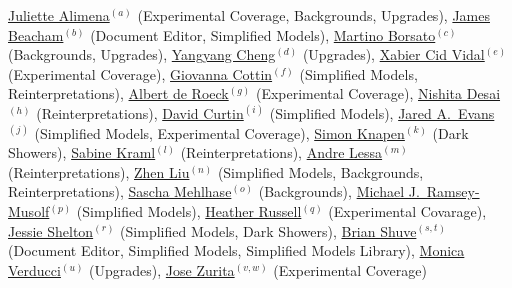 \noindent  \href{mailto:juliette.alimena@cern.ch}{Juliette Alimena}$^{(a)}$ (Experimental Coverage, Backgrounds, Upgrades), \href{mailto:j.beacham@cern.ch}{James Beacham}$^{(b)}$ (Document Editor, Simplified Models), \href{mailto:martino.borsato@cern.ch}{Martino Borsato}$^{(c)}$ (Backgrounds, Upgrades),
\href{mailto:yangyang.cheng@cornell.edu}{Yangyang Cheng}$^{(d)}$ (Upgrades), \href{mailto:xabier.cid.vidal@cern.ch}{Xabier Cid Vidal}$^{(e)}$ (Experimental Coverage), \href{mailto:gcottin@phys.ntu.edu.tw}{Giovanna Cottin}$^{(f)}$ (Simplified Models, Reinterpretations), \href{mailto:deroeck@mail.cern.ch}{Albert de Roeck}$^{(g)}$ (Experimental Coverage), \href{mailto:ddesai@theory.tifr.res.in}{Nishita Desai}$^{(h)}$ (Reinterpretations), \href{mailto:dcurtin@physics.utoronto.ca}{David Curtin}$^{(i)}$ (Simplified Models), \href{mailto:jaredaevans@gmail.com}{Jared A.~Evans}$^{(j)}$ (Simplified Models, Experimental Coverage), \href{mailto:knapen@ias.edu}{Simon Knapen}$^{(k)}$ (Dark Showers), \href{mailto:sabine.kraml@lpsc.in2p3.fr}{Sabine Kraml}$^{(l)}$ (Reinterpretations), \href{mailto:andre.lessa@ufabc.edu.br}{Andre Lessa}$^{(m)}$ (Reinterpretations),  \href{mailto:zliuphys@umd.edu}{Zhen Liu}$^{(n)}$ (Simplified Models, Backgrounds, Reinterpretations), \href{mailto:sascha.mehlhase@cern.ch}{Sascha Mehlhase}$^{(o)}$ (Backgrounds), \href{mailto:mjrm@physics.umass.edu}{Michael J.~Ramsey-Musolf}$^{(p)}$ (Simplified Models),
\href{mailto:hrussell@cern.ch}{Heather Russell}$^{(q)}$ (Experimental Covarage), \href{mailto:sheltonj@illinois.edu}{Jessie Shelton}$^{(r)}$ (Simplified Models, Dark Showers), \href{mailto:bshuve@g.hmc.edu}{Brian Shuve}$^{(s,t)}$ (Document Editor, Simplified Models, Simplified Models Library),  \href{mailto:monica.verducci@cern.ch}{Monica Verducci}$^{(u)}$ (Upgrades), \href{mailto:jose.zurita@kit.edu}{Jose Zurita}$^{(v,w)}$ (Experimental Coverage)

\vspace{0.5cm}

